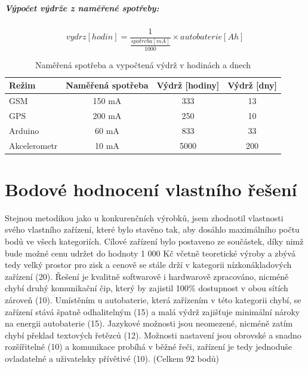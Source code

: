 \documentclass[FM,MP]{tulthesis}  %
\begin{document}
\paragraph{Výpočet výdrže z naměřené spotřeby:}
$$ vydrz [hodin] = \frac{1}{\frac{spotreba[mA]}{1000}} \times autobaterie[Ah] $$

\renewcommand{\arraystretch}{1.5}
\begin{table}[H]
\begin{center}
\begin{tabular}{| l | c | c |  c |}
\hline
Režim & Naměřená spotřeba & Výdrž [hodiny] & Výdrž [dny]\\
\hline
\hline
GSM & 150 mA & 333 & 13\\
\hline
GPS & 200 mA & 250 & 10\\
\hline
Arduino & 60 mA & 833 & 33\\
\hline
Akcelerometr & 10 mA & 5000 & 200\\
\hline
\end{tabular}
\end{center}
\caption{Naměřená spotřeba a vypočtená výdrž v hodinách a dnech}
\end{table}


\chapter{Bodové hodnocení vlastního řešení}
Stejnou metodikou jako u konkurenčních výrobků, jsem zhodnotil vlastnosti svého vlastního zařízení, které bylo stavěno tak, aby dosáhlo maximálního počtu bodů ve všech kategoriích. Cílové zařízení bylo postaveno ze součástek, díky nimž bude možné cenu udržet do hodnoty 1 000 Kč včetně teoretické výroby a zbývá tedy velký prostor pro zisk a cenově se stále drží v kategorii nízkonákladových zařízení (20). Řešení je kvalitně softwarově i hardwarově zpracováno, nicméně chybí druhý komunikační čip, který by zajistil 100\% dostupnost v obou sítích zároveň (10). Umístěním u autobaterie, která zařízením v této kategorii chybí, se zařízení stává špatně odhalitelným (15) a malá výdrž zajišťuje minimální nároky na energii autobaterie (15). Jazykové možnosti jsou neomezené, nicméně zatím chybí překlad textových řetězců (12). Možnosti nastavení jsou obrovské a snadno rozšířitelné (10) a komunikace probíhá v běžné řeči, zařízení je tedy jednoduše ovladatelné a uživatelsky přívětivé (10). (Celkem 92 bodů)
\end{document}
